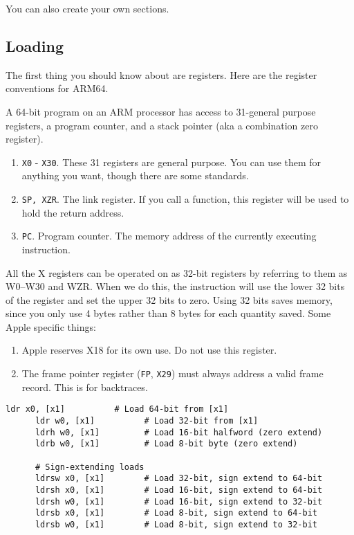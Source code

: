   You can also create your own sections. 

\subsection{Loading}

  The first thing you should know about are registers. Here are the register conventions for ARM64. 

  \begin{definition}
    A 64-bit program on an ARM processor has access to 31-general purpose registers, a program counter, and a stack pointer (aka a combination zero register). 
    \begin{enumerate}
      \item \texttt{X0} - \texttt{X30}. These 31 registers are general purpose. You can use them for anything you want, though there are some standards. 
      \item \texttt{SP, XZR}. The link register. If you call a function, this register will be used to hold the return address. 
      \item \texttt{PC}. Program counter. The memory address of the currently executing instruction. 
    \end{enumerate}
    All the X registers can be operated on as 32-bit registers by referring to them as W0–W30 and WZR. When we do this, the instruction will use the lower 32 bits of the register and set the upper 32 bits to zero. Using 32 bits saves memory, since you only use 4 bytes rather than 8 bytes for each quantity saved. 
    Some Apple specific things: 
    \begin{enumerate}
      \item Apple reserves X18 for its own use. Do not use this register. 
      \item The frame pointer register (\texttt{FP}, \texttt{X29}) must always address a valid frame record. This is for backtraces. 
    \end{enumerate}
  \end{definition}

  \begin{definition}
    \begin{lstlisting}[language=arm]
      ldr x0, [x1]          # Load 64-bit from [x1]
      ldr w0, [x1]          # Load 32-bit from [x1]
      ldrh w0, [x1]         # Load 16-bit halfword (zero extend)
      ldrb w0, [x1]         # Load 8-bit byte (zero extend)
      
      # Sign-extending loads
      ldrsw x0, [x1]        # Load 32-bit, sign extend to 64-bit
      ldrsh x0, [x1]        # Load 16-bit, sign extend to 64-bit
      ldrsh w0, [x1]        # Load 16-bit, sign extend to 32-bit
      ldrsb x0, [x1]        # Load 8-bit, sign extend to 64-bit
      ldrsb w0, [x1]        # Load 8-bit, sign extend to 32-bit
    \end{lstlisting}
  \end{definition}

